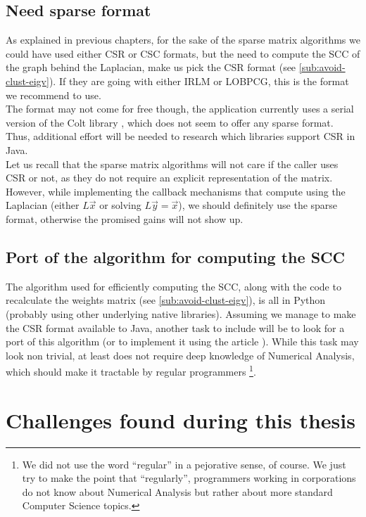 \subsection{Need sparse format}

As explained in previous chapters, for the sake of the sparse matrix
algorithms we 
could have used either CSR or CSC formats, but the need to compute the
\gls{SCC} of the graph behind the \gls{Laplacian}, make us pick the CSR
format (see \cref{sub:avoid-clust-eigv}). If they are going with
either \gls{IRLM} or \gls{LOBPCG}, this is the format we recommend to use. \\

The format may not come for free though, the application currently
uses a serial version of the Colt library \cite{colt}, which does not
seem to offer any sparse format. Thus, additional effort will be
needed to research which libraries support CSR in Java. \\

Let us recall that the sparse matrix algorithms will not care if the caller uses
CSR or not, as they do not require an explicit representation of the
matrix. However, while implementing the callback mechanisms that 
compute using the \gls{Laplacian} (either $L\vec{x}$ or solving $L\vec{y} =
\vec{x}$), we should definitely use the sparse format, otherwise the
promised gains will not show up.

\subsection{Port of the algorithm for computing the \gls{SCC}}

The algorithm used for efficiently computing the \gls{SCC}, along with the
code to recalculate the weights matrix (see
\cref{sub:avoid-clust-eigv}), is all in Python (probably 
using other underlying native libraries). Assuming we manage to make the CSR
format available to Java, another task to include will be to look for
a port of this algorithm (or to implement it using the article
\cite{pearce05}). While this task may look non trivial, at least does
not require deep knowledge of Numerical Analysis, which should make it
tractable by regular programmers \footnote{We did not use the
word ``regular'' in a pejorative sense, of course. We just try to make
the point that ``regularly'', programmers working in corporations do
not know about Numerical Analysis but rather about more standard
Computer Science topics.}.

\section{Challenges found during this thesis}

